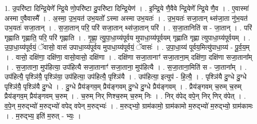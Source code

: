 \documentclass[17pt]{extarticle}
\begin{document}
1. उ॒परि॑ष्टा दिन्द्रि॒येणे᳚ न्द्रि॒ये णो॒परि॑ष्टा दु॒परि॑ष्टा दिन्द्रि॒येण॑ । . इ॒न्द्रि॒ये णै॒वैवे न्द्रि॒येणे᳚ न्द्रि॒ये णै॒व । . ए॒वास्मा॑ अस्मा ए॒वैवास्मै᳚ । . अ॒स्मा॒ उ॒भ॒यत॑ उभ॒यतो᳚ ऽस्मा अस्मा उभ॒यतः॑ । . उ॒भ॒यतः॑ सजा॒तान् थ्स॑जा॒ता नु॑भ॒यत॑ उभ॒यतः॑ सजा॒तान् । . स॒जा॒तान् परि॒ परि॑ सजा॒तान् थ्स॑जा॒तान् परि॑ । . स॒जा॒तानिति॑ स - जा॒तान् । . परि॑ गृह्णाति गृह्णाति॒ परि॒ परि॑ गृह्णाति । . गृ॒ह्णा॒ त्यु॒पा॒धा॒य्य॑पूर्वय मुपाधा॒य्य॑पूर्वयम् गृह्णाति गृह्णा त्युपाधा॒य्य॑पूर्वयम् । . उ॒पा॒धा॒य्य॑पूर्वयं॒ ॅवासो॒ वास॑ उपाधा॒य्य॑पूर्वय मुपाधा॒य्य॑पूर्वयं॒ ॅवासः॑ । . उ॒पा॒धा॒य्य॑ पूर्वय॒मित्यु॑पाधा॒य्य॑ - पू॒र्व॒य॒म् । . वासो॒ दक्षि॑णा॒ दक्षि॑णा॒ वासो॒वासो॒ दक्षि॑णा । . दक्षि॑णा सजा॒तानाꣳ॑ सजा॒ताना॒म् दक्षि॑णा॒ दक्षि॑णा सजा॒ताना᳚म् । . स॒जा॒ताना॒ मुप॑हित्या॒ उप॑हित्यै सजा॒तानाꣳ॑ सजा॒ताना॒ मुप॑हित्यै । . स॒जा॒ताना॒मिति॑ स - जा॒ताना᳚म् । . उप॑हित्यै॒ पृश्ञि॑यै॒ पृश्ञि॑या॒ उप॑हित्या॒ उप॑हित्यै॒ पृश्ञि॑यै । . उप॑हित्या॒ इत्युप॑ - हि॒त्यै॒ । . पृश्ञि॑यै दु॒ग्धे दु॒ग्धे पृश्ञि॑यै॒ पृश्ञि॑यै दु॒ग्धे । . दु॒ग्धे प्रैय॑ङ्गव॒म् प्रैय॑ङ्गवम् दु॒ग्धे दु॒ग्धे प्रैय॑ङ्गवम् । . प्रैय॑ङ्गवम् च॒रुम् च॒रुम् प्रैय॑ङ्गव॒म् प्रैय॑ङ्गवम् च॒रुम् । . च॒रुम् निर् णिश्च॒रुम् च॒रुम् निः । . निर् व॑पेद् वपे॒न् निर् णिर् व॑पेत् । . व॒पे॒न् म॒रुद्भ्यो॑ म॒रुद्भ्यो॑ वपेद् वपेन् म॒रुद्भ्यः॑ । . म॒रुद्भ्यो॒ ग्राम॑कामो॒ ग्राम॑कामो म॒रुद्भ्यो॑ म॒रुद्भ्यो॒ ग्राम॑कामः । . म॒रुद्भ्य॒ इति॑ म॒रुत् - भ्यः॒ । \newline
\end{document}
